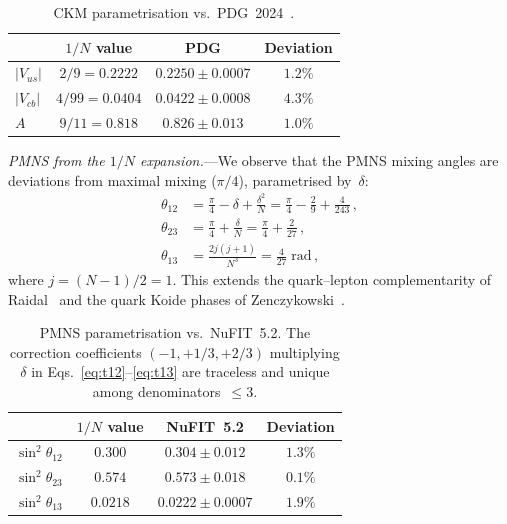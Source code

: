 \documentclass[aps,prl,twocolumn,showpacs,preprintnumbers,superscriptaddress]{revtex4-2}
\begin{document}
\begin{table}[b]
\caption{CKM parametrisation vs.\ PDG~2024~\cite{PDG:2024}.}
\label{tab:ckm}
\begin{ruledtabular}
\begin{tabular}{lccc}
  & $1/N$ value & PDG & Deviation \\
\hline
$|V_{us}|$ & $2/9 = 0.2222$ & $0.2250 \pm 0.0007$ & $1.2\%$ \\
$|V_{cb}|$ & $4/99 = 0.0404$ & $0.0422 \pm 0.0008$ & $4.3\%$\footnotemark[1] \\
$A$ & $9/11 = 0.818$ & $0.826 \pm 0.013$ & $1.0\%$ \\
\end{tabular}
\end{ruledtabular}
\end{table}


\textit{PMNS from the $1/N$ expansion.}---We observe that the PMNS
mixing angles are deviations from maximal mixing ($\pi/4$),
parametrised by~$\delta$:
\begin{align}
  \theta_{12} &= \frac{\pi}{4} - \delta + \frac{\delta^2}{N}
  = \frac{\pi}{4} - \frac{2}{9} + \frac{4}{243}\,,
  \label{eq:t12} \\
  \theta_{23} &= \frac{\pi}{4} + \frac{\delta}{N}
  = \frac{\pi}{4} + \frac{2}{27}\,,
  \label{eq:t23} \\
  \theta_{13} &= \frac{2j(j{+}1)}{N^3}
  = \frac{4}{27}\;\text{rad}\,,
  \label{eq:t13}
\end{align}
where $j = (N{-}1)/2 = 1$.
This extends the quark--lepton complementarity of
Raidal~\cite{Raidal:2004} and the quark Koide phases
of Zenczykowski~\cite{Zenczykowski:2012}.

\begin{table}[b]
\caption{PMNS parametrisation vs.\ NuFIT~5.2.
The correction coefficients $(-1,+1/3,+2/3)$ multiplying
$\delta$ in Eqs.~\eqref{eq:t12}--\eqref{eq:t13} are
traceless and unique among denominators~$\leq 3$.}
\label{tab:pmns}
\begin{ruledtabular}
\begin{tabular}{lccc}
  & $1/N$ value & NuFIT~5.2 & Deviation \\
\hline
$\sin^2\theta_{12}$ & $0.300$ & $0.304 \pm 0.012$ & $1.3\%$ \\
$\sin^2\theta_{23}$ & $0.574$ & $0.573 \pm 0.018$ & $0.1\%$ \\
$\sin^2\theta_{13}$ & $0.0218$ & $0.0222 \pm 0.0007$ & $1.9\%$ \\
\end{tabular}
\end{ruledtabular}
\end{table}
\end{document}
